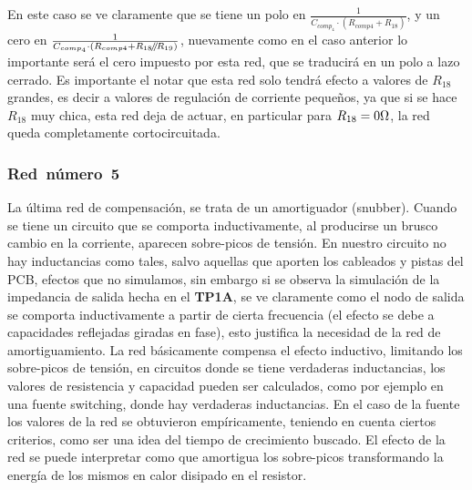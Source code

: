 En este caso se ve claramente que se tiene un polo en $\frac{1}{ C_{comp_{4}} \cdot \left( R_{comp4} + R_{18} \right) }$, y un cero en $\frac{1}{ C_{comp_{4}} \cdot \left(  R_{comp4} + R_{18} \mathbin{\!/\mkern-5mu/\!} R_{19}  \right) }$, nuevamente como en el caso anterior lo importante será el cero impuesto por esta red, que se traducirá en un polo a lazo cerrado. Es importante el notar que esta red solo tendrá efecto a valores de $R_{18}$ grandes, es decir a valores de regulación de corriente pequeños, ya que si se hace $R_{18}$ muy chica, esta red deja de actuar, en particular para $R_{18} = 0 \si[per-mode=symbol]{\ohm}$, la red queda completamente cortocircuitada.


\subsubsection{\textbf{Red~número~5}}

La última red de compensación, se trata de un amortiguador (snubber). Cuando se tiene un circuito que se comporta inductivamente, al producirse un brusco cambio en la corriente, aparecen sobre-picos de tensión. En nuestro circuito no hay inductancias como tales, salvo aquellas que aporten los cableados y pistas del PCB, efectos que no simulamos, sin embargo si se observa la simulación de la impedancia de salida hecha en el \textbf{TP1A}, se ve claramente como el nodo de salida se comporta inductivamente a partir de cierta frecuencia (el efecto se debe a capacidades reflejadas giradas en fase), esto justifica la necesidad de la red de amortiguamiento. La red básicamente compensa el efecto inductivo, limitando los sobre-picos de tensión, en circuitos donde se tiene verdaderas inductancias, los valores de resistencia y capacidad pueden ser calculados, como por ejemplo en una fuente switching, donde hay verdaderas inductancias. En el caso de la fuente los valores de la red se obtuvieron empíricamente, teniendo en cuenta ciertos criterios, como ser una idea del tiempo de crecimiento buscado. El efecto de la red se puede interpretar como que amortigua los sobre-picos transformando la energía de los mismos en calor disipado en el resistor.




